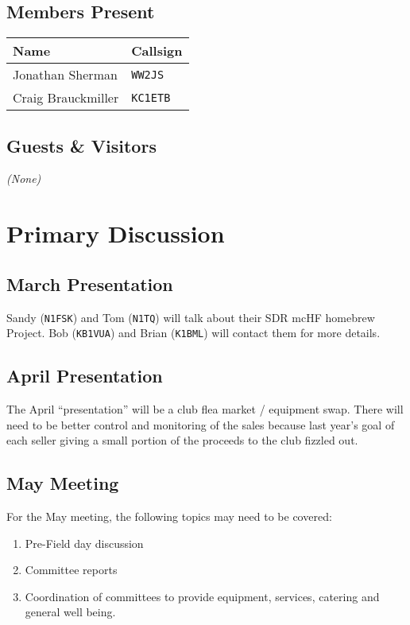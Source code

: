 \documentclass[10pt,letterpaper]{article}
\begin{document}
\subsection{Members Present}

\begin{tabular}{|l|l|}
\hline
\textbf{Name} & \textbf{Callsign} \\ \hline
Jonathan Sherman & \texttt{WW2JS} \\ \hline
Craig Brauckmiller & \texttt{KC1ETB} \\ \hline
\end{tabular}

\subsection{Guests \& Visitors}
\emph{(None)}

\section{Primary Discussion}

\subsection{March Presentation}
Sandy (\texttt{N1FSK}) and Tom (\texttt{N1TQ}) will talk about their SDR mcHF homebrew Project.  Bob (\texttt{KB1VUA}) and Brian (\texttt{K1BML}) will contact them for more details.

\subsection{April Presentation}
The April ``presentation'' will be a club flea market / equipment swap. There will need to be better control and monitoring of the sales because last year’s goal of each seller giving a small portion of the proceeds to the club fizzled out.

\subsection{May Meeting}
For the May meeting, the following topics may need to be covered:
\begin{enumerate}
\item Pre-Field day discussion
\item Committee reports
\item Coordination of committees to provide equipment, services, catering and general well being.
\end{enumerate}
\end{document}
